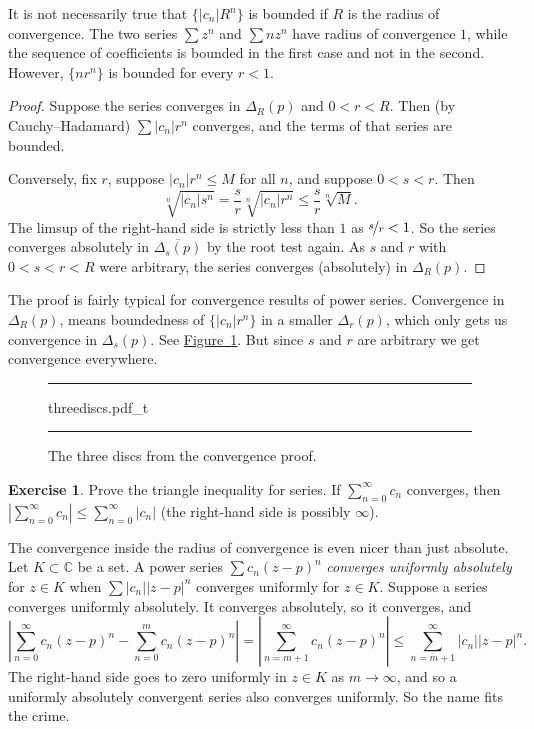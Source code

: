 \documentclass[12pt,openany]{book}
\newcommand{\sabs}[1]{\lvert {#1} \rvert}
\newcommand{\abs}[1]{\left\lvert {#1} \right\rvert}
\newcommand{\C}{{\mathbb{C}}}
\newcommand{\myindex}[1]{#1\index{#1}}
\theoremstyle{plain}
\theoremstyle{remark}
\theoremstyle{definition}
\newenvironment{exbox}{%
    \def\FrameCommand{\vrule width 1pt \relax\hspace{10pt}}%
    \MakeFramed{\advance\hsize-\width\FrameRestore}%
}{%
    \endMakeFramed
}
\newenvironment{myfig}{%
\begin{figure}[h!t]
\noindent\rule{\textwidth}{0.5pt}\vspace{12pt}\par\centering}%
{\par\noindent\rule{\textwidth}{0.5pt}
\end{figure}}
\theoremstyle{exercise}
\newtheorem{exercise}{Exercise}[section]
\theoremstyle{example}
\newcommand{\figureref}[1]{\hyperref[#1]{Figure~\ref*{#1}}}
\begin{document}
It is not necessarily true that $\bigl\{ \sabs{c_n} R^n \bigr\}$
is bounded if $R$ is the radius of convergence.
The two series $\sum z^n$ and $\sum n z^n$ have
radius of convergence $1$, while the sequence of coefficients
is bounded in the first case and
not in the second.  However, $\{ n r^n \}$ is bounded for every $r < 1$.

\begin{proof}
Suppose the series converges in $\Delta_{R}(p)$ and
$0 < r < R$.  Then (by Cauchy--Hadamard) $\sum \sabs{c_n}r^n$ converges,
and the terms of that series are bounded.

Conversely, fix $r$, suppose 
$\sabs{c_n} r^n \leq M$ for all $n$, and suppose $0 < s < r$.
Then
\begin{equation*}
\sqrt[n]{\sabs{c_n} s^n}=
\frac{s}{r}\sqrt[n]{\sabs{c_n} r^n} \leq \frac{s}{r} \sqrt[n]{M} .
\end{equation*}
The limsup of the right-hand side is strictly less than $1$
as $\nicefrac{s}{r} < 1$.
So the series converges absolutely in
$\overline{\Delta_s(p)}$ by the root test again.
As $s$ and $r$ with $0 < s < r < R$ were arbitrary,
the series converges (absolutely) in $\Delta_R(p)$.
\end{proof}

The proof is fairly typical for convergence results of power series.
Convergence in $\Delta_R(p)$, means boundedness of
$\{ \sabs{c_n} r^n \}$ in a smaller $\Delta_r(p)$, which only gets us convergence
in $\Delta_s(p)$.  See \figureref{fig:threediscs}.  But since $s$ and $r$
are arbitrary we get convergence everywhere.
\begin{myfig}
{threediscs.pdf_t}
\caption{The three discs from the convergence proof.\label{fig:threediscs}}
\end{myfig}

\begin{exbox}
\begin{exercise}
Prove the triangle inequality for series.  If $\sum_{n=0}^\infty c_n$
converges, then $\abs{\sum_{n=0}^\infty c_n} \leq \sum_{n=0}^\infty
\sabs{c_n}$ (the right-hand side is possibly $\infty$).
\end{exercise}
\end{exbox}

The convergence inside the radius of convergence is even nicer than just absolute.
Let $K \subset \C$ be a set.
A power series $\sum c_n {(z-p)}^n$
\emph{\myindex{converges uniformly absolutely}}
for $z \in K$ when $\sum \sabs{c_n} \sabs{z-p}^n$
converges uniformly for $z \in K$.
Suppose a series converges uniformly absolutely.  It converges absolutely,
so it converges, and 
\begin{equation*}
\abs{
\sum_{n=0}^\infty c_n {(z-p)}^n
-
\sum_{n=0}^{m} c_n {(z-p)}^n
}
=
\abs{\sum_{n=m+1}^\infty c_n {(z-p)}^n} \leq
\sum_{n=m+1}^\infty \sabs{c_n} \sabs{z-p}^n .
\end{equation*}
The right-hand side goes to zero uniformly in $z \in K$ as $m \to \infty$,
and so
a uniformly absolutely convergent series also converges
uniformly.  So the name fits the crime.
\end{document}
